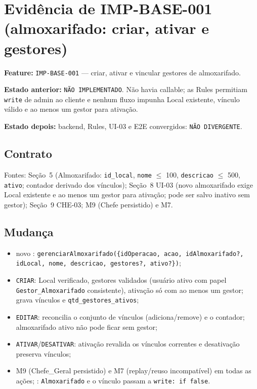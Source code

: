 \section{Evidência de IMP-BASE-001 (almoxarifado: criar, ativar e gestores)}

\textbf{Feature:} \texttt{IMP-BASE-001} --- criar, ativar e vincular gestores de
almoxarifado.

\textbf{Estado anterior:} \texttt{NÃO IMPLEMENTADO}. Não havia callable; as
Rules permitiam \texttt{write} de admin ao cliente e nenhum fluxo impunha Local
existente, vínculo válido e ao menos um gestor para ativação.

\textbf{Estado depois:} backend, Rules, UI-03 e E2E convergidos:
\texttt{NÃO DIVERGENTE}.

\subsection{Contrato}

Fontes: Seção~5 (Almoxarifado: \texttt{id\_local}, \texttt{nome} $\le$ 100,
\texttt{descricao} $\le$ 500, \texttt{ativo}; contador derivado dos vínculos);
Seção~8 UI-03 (novo almoxarifado exige Local existente e ao menos um gestor para
ativação; pode ser salvo inativo sem gestor); Seção~9 CHE-03; M9 (Chefe
persistido) e M7.

\subsection{Mudança}

\begin{itemize}
  \item novo : \texttt{gerenciarAlmoxarifado(\{idOperacao, acao, idAlmoxarifado?, idLocal, nome, descricao, gestores?, ativo?\})};
  \item \texttt{CRIAR}: Local verificado, gestores validados (usuário ativo com
  papel \texttt{Gestor\_Almoxarifado} consistente), ativação só com ao menos um
  gestor; grava vínculos e \texttt{qtd\_gestores\_ativos};
  \item \texttt{EDITAR}: reconcilia o conjunto de vínculos (adiciona/remove) e o
  contador; almoxarifado ativo não pode ficar sem gestor;
  \item \texttt{ATIVAR}/\texttt{DESATIVAR}: ativação revalida os vínculos
  correntes e desativação preserva vínculos;
  \item M9 (Chefe\_Geral persistido) e M7 (replay/reuso incompatível) em todas as
  ações; : \texttt{Almoxarifado} e o vínculo passam a
  \texttt{write: if false}.
\end{itemize}

